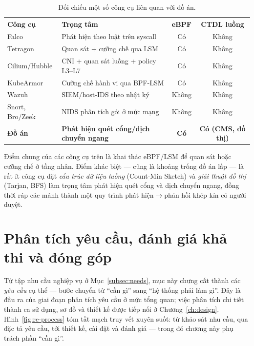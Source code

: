 \begin{table}[H]
  \centering
  \caption{Đối chiếu một số công cụ liên quan với đồ án.}
  \label{tab:tool-compare}
  \small
  \begin{tabularx}{\linewidth}{@{}l X c c@{}}
    \toprule
    \textbf{Công cụ} & \textbf{Trọng tâm} & \textbf{eBPF} & \textbf{CTDL luồng} \\
    \midrule
    Falco          & Phát hiện theo luật trên syscall        & Có   & Không \\
    Tetragon       & Quan sát + cưỡng chế qua LSM            & Có   & Không \\
    Cilium/Hubble  & CNI + quan sát luồng + policy L3--L7    & Có   & Không \\
    KubeArmor      & Cưỡng chế hành vi qua BPF-LSM           & Có   & Không \\
    Wazuh          & SIEM/host-IDS theo nhật ký             & Không& Không \\
    Snort, Bro/Zeek& NIDS phân tích gói ở mức mạng          & Không& Không \\
    \textbf{Đồ án} & \textbf{Phát hiện quét cổng/dịch chuyển ngang} & \textbf{Có} & \textbf{Có (CMS, đồ thị)} \\
    \bottomrule
  \end{tabularx}
\end{table}

Điểm chung của các công cụ trên là khai thác eBPF/LSM để quan sát hoặc cưỡng chế ở tầng
nhân. Điểm khác biệt --- cũng là khoảng trống đồ án lấp --- là rất ít công cụ đặt
\emph{cấu trúc dữ liệu luồng} (Count-Min Sketch) và \emph{giải thuật đồ thị} (Tarjan, BFS)
làm trọng tâm phát hiện quét cổng và dịch chuyển ngang, đồng thời ráp các mảnh thành một
quy trình phát hiện$\rightarrow$phản hồi khép kín có người duyệt.

\section{Phân tích yêu cầu, đánh giá khả thi và đóng góp}
\label{sec:requirements}

Từ tập nhu cầu nghiệp vụ ở Mục~\ref{subsec:needs}, mục này chưng cất thành các \emph{yêu
cầu} cụ thể --- bước chuyển từ ``cần gì'' sang ``hệ thống phải làm gì''. Đây là đầu ra của
giai đoạn phân tích yêu cầu ở mức tổng quan; việc phân tích chi tiết thành ca sử dụng, sơ
đồ và thiết kế được tiếp nối ở Chương~\ref{ch:design}. Hình~\ref{fig:re-process} tóm tắt
mạch truy vết xuyên suốt: từ khảo sát nhu cầu, qua đặc tả yêu cầu, tới thiết kế, cài đặt và
đánh giá --- trong đó chương này phụ trách phần ``cần gì''.

